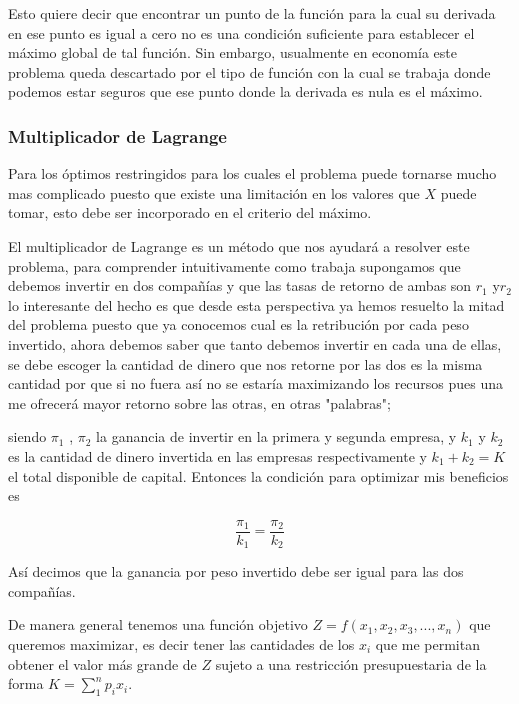 \documentclass[12pt]{article}
\begin{document}
{\begin{figure}
\begin{center}
\end{center}


\end{figure}

Esto quiere decir que encontrar un punto de la función para la cual su derivada en ese punto es igual a cero no es una condición suficiente para establecer el máximo global de tal función. Sin embargo, usualmente en economía este problema queda descartado por el tipo de función con la cual se trabaja donde podemos estar seguros que ese punto donde la derivada es nula es el máximo.



\subsubsection{Multiplicador de Lagrange}

Para los óptimos restringidos para los cuales el problema puede tornarse mucho mas complicado puesto que existe una limitación en los valores que $X$ puede tomar, esto debe ser incorporado en el criterio del máximo.

El multiplicador de Lagrange es un método que nos ayudará a resolver este problema, para comprender intuitivamente como trabaja supongamos que debemos invertir en dos compañías y que las tasas de retorno de ambas 
son $r_{1}$ y$ r_{2}$ lo interesante del hecho es que desde esta perspectiva ya hemos resuelto la mitad del problema puesto que ya conocemos cual es la retribución por cada peso invertido, ahora debemos saber que tanto debemos invertir en cada una de ellas, se debe escoger la cantidad de dinero que nos retorne por las dos es la misma cantidad por que si no fuera así no se estaría maximizando los recursos pues una me ofrecerá mayor retorno sobre las otras, en otras "palabras";

siendo $\pi_{1}$ , $\pi_{2}$ la ganancia de invertir en la primera y segunda empresa, y $k_{1}$ y $k_{2}$ es la cantidad de dinero invertida en las empresas respectivamente y $k_{1}+ k_{2} =K $ el total disponible de capital. Entonces la condición para optimizar mis beneficios es 

$$\dfrac{\pi_{1}}{k_{1}}=\dfrac{\pi_{2}}{k_{2}}$$

Así decimos que la ganancia por peso invertido debe ser igual para las dos compañías.

De manera general tenemos una función objetivo $Z=f(x_1,x_2,x_3,...,x_n)$ que queremos maximizar, es decir tener las cantidades de los $x_{i}$ que me permitan obtener el valor más grande de  $Z$ sujeto a una restricción presupuestaria de la forma $K=\sum_{1}^{n}p_{i}x_{i}$.

}
\end{document}
